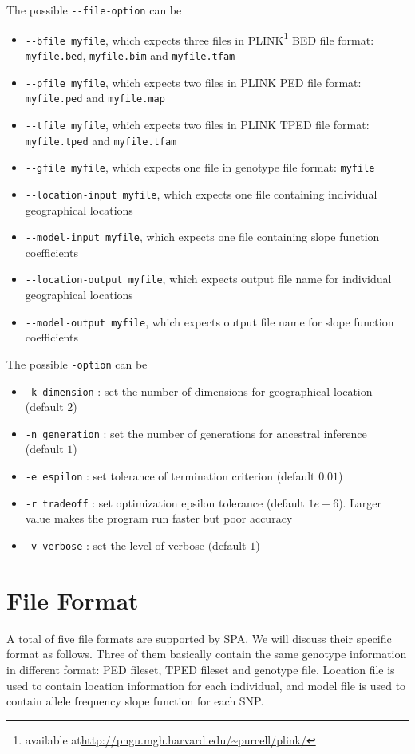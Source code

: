 \documentclass[12pt]{article}
\begin{document}
The possible \verb+--file-option+ can be
\begin{itemize}
\item \verb+--bfile myfile+, which expects three files in PLINK\footnote{available
at\url{http://pngu.mgh.harvard.edu/~purcell/plink/}} BED file format: \verb+myfile.bed+,
\verb+myfile.bim+ and \verb+myfile.tfam+
\item \verb+--pfile myfile+, which expects two files in PLINK PED file format: \verb+myfile.ped+ and \verb+myfile.map+ 
\item \verb+--tfile myfile+, which expects two files in PLINK TPED file format: \verb+myfile.tped+ and \verb+myfile.tfam+
\item \verb+--gfile myfile+, which expects one file in genotype file format: \verb+myfile+
\item \verb+--location-input myfile+, which expects one file containing individual geographical
locations
\item \verb+--model-input myfile+, which expects one file containing slope function coefficients
\item \verb+--location-output myfile+, which expects output file name for individual geographical
locations
\item \verb+--model-output myfile+, which expects output file name for slope function coefficients
\end{itemize} 

The possible \verb+-option+ can be
\begin{itemize}
\item \verb+-k dimension+ : set the number of dimensions for geographical location (default $2$)
\item \verb+-n generation+ : set the number of generations for ancestral inference (default $1$)
\item \verb+-e espilon+ : set tolerance of termination criterion (default $0.01$)
\item \verb+-r tradeoff+ : set optimization epsilon tolerance (default $1e-6$). Larger value makes the
program run faster but poor accuracy
\item \verb+-v verbose+ : set the level of verbose (default $1$)
\end{itemize}


\section*{File Format}

A total of five file formats are supported by SPA. We will discuss their specific format as follows.
Three of them basically contain the same genotype information in different format: PED fileset, TPED
fileset and genotype file. Location file is used to contain location information for each
individual, and model file is used to contain allele frequency slope function for each SNP.
\end{document}
